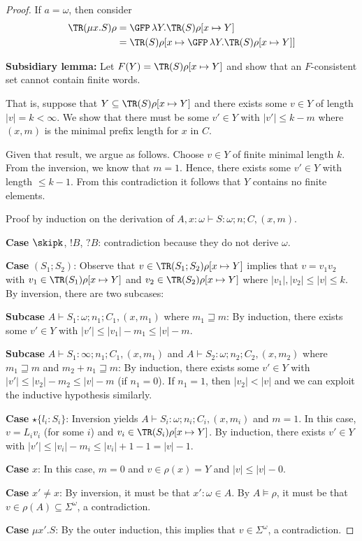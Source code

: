 \begin{proof}
  If $a= \omega$, then consider
  \begin{align*}
    \TR (\mu x.S)\rho & = \GFP\, \lambda Y. \TR (S)\rho[x\mapsto Y] \\
    & = \TR (S)\rho[x\mapsto \GFP\, \lambda Y. \TR (S)\rho[x\mapsto Y]]
  \end{align*}

  \textbf{Subsidiary lemma:}
  Let $F (Y) = \TR (S)\rho[x\mapsto Y]$ and show that an $F$-consistent set
  cannot contain finite words.

  That is, suppose that $Y \subseteq \TR (S)\rho[x\mapsto Y]$ and there exists some $v \in Y$ of 
  length $|v| = k < \infty$. We show that there must be some $v' \in Y$ with $|v'|\le k-m$ where
  $(x,m)$ is the minimal prefix length for $x$ in $C$.

  Given that result, we argue as follows. Choose $v \in Y$ of finite minimal length $k$. From the
  inversion, we know that $m=1$. Hence, there exists some $v' \in Y$ with length $\le k-1$. From
  this contradiction it follows that $Y$ contains no finite elements.
  
  Proof by induction on the derivation of $A, x:\omega \vdash S : \omega; n; C,(x,m)$.

  \textbf{Case }$\skipk$, $!B$, $?B$: contradiction because they do not derive $\omega$.

  \textbf{Case }$(S_1;S_2)$: Observe that $v \in \TR (S_1;S_2)\rho[x\mapsto Y]$ implies that $v = v_1v_2$ with
  $v_1 \in \TR (S_1)\rho[x\mapsto Y]$ and $v_2 \in \TR (S_2)\rho[x\mapsto Y]$ where $|v_1|, |v_2| \le |v| \le k$.
  By inversion, there are two subcases:

  \textbf{Subcase }$A \vdash S_1:\omega;n_1;C_1,(x,m_1)$ where $m_1\sqsupseteq m$: By induction,
  there exists some $v'\in Y$ with $|v'| \le |v_1| - m_1 \le |v| - m$.

  \textbf{Subcase }$A \vdash S_1:\infty;n_1;C_1,(x,m_1)$ and $A \vdash S_2:\omega;n_2;C_2,(x,m_2)$
  where  $m_1\sqsupseteq m$ and  $m_2 + n_1 \sqsupseteq m$:
  By induction, there exists some $v'\in Y$ with $|v'| \le  |v_2| - m_2 \le |v| - m$ (if $n_1=0$).
  If $n_1=1$, then $|v_2| < |v|$ and we can exploit the inductive hypothesis similarly.

  \textbf{Case }$\star\{l_i\colon S_i\}$: Inversion yields $A \vdash S_i: \omega; n_i;C_i,(x,m_i)$
  and $m =1$.
  In this case, $v = L_iv_i$ (for some $i$) and $v_i \in \TR
  (S_i)\rho[x\mapsto Y]$. By induction, there exists $v'\in Y$ with $|v'|\le |v_i| - m_i \le |v_i|+1
  -1 = |v| -1$.

  \textbf{Case }$x$: In this case, $m=0$ and $v \in \rho (x) = Y$ and $|v|\le |v|-0$.

  \textbf{Case }$x'\ne x$: By inversion, it must be that $x':\omega \in A$. By $A \models \rho$, it
  must be that $v \in \rho (A) \subseteq \Sigma^\omega$, a contradiction.

  \textbf{Case }$\mu x'.S$: By the outer induction, this implies that $v\in\Sigma^\omega$, a contradiction.
\end{proof}

